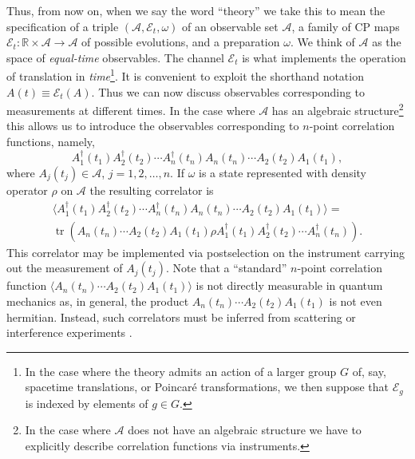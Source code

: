 \documentclass[11pt]{amsart}
\DeclareMathOperator{\tr}{tr}
\theoremstyle{plain}%
\theoremstyle{definition}
\theoremstyle{remark}
\begin{document}
Thus, from now on, when we say the word ``theory'' we take this to mean the specification of a triple $(\mathcal{A}, \mathcal{E}_t, \omega)$ of an observable set $\mathcal{A}$, a family of CP maps $\mathcal{E}_t: \mathbb{R}\times\mathcal{A}\rightarrow \mathcal{A}$ of possible evolutions, and a preparation $\omega$. We think of $\mathcal{A}$ as the space of \emph{equal-time} observables. The channel $\mathcal{E}_t$ is what implements the operation of translation in \emph{time}\footnote{In the case where the theory admits an action of a larger group $G$ of, say, spacetime translations, or Poincar\'e transformations, we then suppose that $\mathcal{E}_g$ is indexed by elements of $g\in G$.}. It is convenient to exploit the shorthand notation $A(t) \equiv \mathcal{E}_t(A)$. Thus we can now discuss observables corresponding to measurements at different times. In the case where $\mathcal{A}$ has an algebraic structure\footnote{In the case where $\mathcal{A}$ does not have an algebraic structure we have to explicitly describe correlation functions via instruments.} this allows us to introduce the observables corresponding to $n$-point correlation functions, namely, 
\begin{equation}
	A_1^\dag(t_1)A_2^\dag(t_2)\cdots A_n^\dag(t_n)A_n(t_n) \cdots A_2(t_2)A_1(t_1),
\end{equation} 
where $A_j(t_j) \in \mathcal{A}$, $j= 1,2, \ldots, n$. If $\omega$ is a state represented with density operator $\rho$ on $\mathcal{A}$ the resulting correlator is
\begin{multline}
	\langle A_1^\dag(t_1)A_2^\dag(t_2)\cdots A_n^\dag(t_n)A_n(t_n) \cdots A_2(t_2)A_1(t_1) \rangle =\\ \tr( A_n(t_n) \cdots A_2(t_2)A_1(t_1)\rho A_1^\dag(t_1) A_2^\dag(t_2) \cdots A_n^\dag(t_n)).
\end{multline}
This correlator may be implemented via postselection on the instrument carrying out the measurement of $A_j(t_j)$. 
Note that a ``standard'' $n$-point correlation function $\langle A_n(t_n) \cdots A_2(t_2)A_1(t_1) \rangle$ is not directly measurable in quantum mechanics as, in general, the product $A_n(t_n) \cdots A_2(t_2)A_1(t_1)$ is not even hermitian. Instead, such correlators must be inferred from scattering \cite{taylor_scattering_2006} or interference experiments \cite{glauber_quantum_1963,mandel_optical_1995}.
\end{document}
